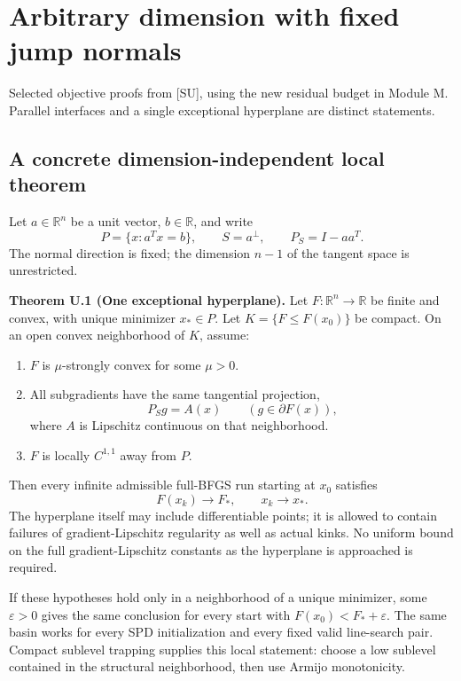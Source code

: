 \documentclass[10pt,oneside,openany]{book}
\providecommand{\tightlist}{\setlength{\itemsep}{0pt}\setlength{\parskip}{0pt}}
\newcommand{\ModuleTag}{I}
\theoremstyle{remark}\newtheorem{remark}{Remark}[chapter]
\newcommand{\StartModule}[3]{\cleardoublepage\renewcommand{\ModuleTag}{#1}\chapter{#2}\label{#1:chapter}\begin{small}\color{Accent}#3\end{small}\par\vspace{3pt}{\color{RuleGray}\hrule}\vspace{9pt}}
\begin{document}
\endgroup


\StartModule{U}{Arbitrary dimension with fixed jump normals}{Selected objective proofs from [SU], using the new residual budget in Module M. Parallel interfaces and a single exceptional hyperplane are distinct statements.}

\begingroup

\setcounter{section}{0}
\setcounter{theorem}{0}
\setcounter{lemma}{0}
\setcounter{corollary}{0}
\setcounter{proposition}{0}
\setcounter{remark}{0}
\setcounter{equation}{0}
\section{A concrete dimension-independent local
theorem}\label{U:a-concrete-dimension-independent-local-theorem}

Let \(a\in\mathbb R^n\) be a unit vector, \(b\in\mathbb R\), and write
\[
 P=\{x:a^Tx=b\},\qquad S=a^\perp,\qquad P_S=I-aa^T.
\] The normal direction is fixed; the dimension \(n-1\) of the tangent
space is unrestricted.

\label{U:one}\textbf{Theorem U.1 (One exceptional hyperplane).} Let
\(F:\mathbb R^n\to\mathbb R\) be finite and convex, with unique
minimizer \(x_*\in P\). Let \(K=\{F\le F(x_0)\}\) be compact. On an open
convex neighborhood of \(K\), assume:

\begin{enumerate}
\def\labelenumi{\arabic{enumi}.}
\tightlist
\item
  \(F\) is \(\mu\)-strongly convex for some \(\mu>0\).
\item
  All subgradients have the same tangential projection,
  \[P_Sg=A(x)\qquad(g\in\partial F(x)),\] where \(A\) is Lipschitz
  continuous on that neighborhood.
\item
  \(F\) is locally \(C^{1,1}\) away from \(P\).
\end{enumerate}

Then every infinite admissible full-BFGS run starting at \(x_0\)
satisfies \[
 \boxed{F(x_k)\to F_*,\qquad x_k\to x_*.}
\] The hyperplane itself may include differentiable points; it is
allowed to contain failures of gradient-Lipschitz regularity as well as
actual kinks. No uniform bound on the full gradient-Lipschitz constants
as the hyperplane is approached is required.

If these hypotheses hold only in a neighborhood of a unique minimizer,
some \(\varepsilon>0\) gives the same conclusion for every start with
\(F(x_0)<F_*+\varepsilon\). The same basin works for every SPD
initialization and every fixed valid line-search pair. Compact sublevel
trapping supplies this local statement: choose a low sublevel contained
in the structural neighborhood, then use Armijo monotonicity.
\end{document}
